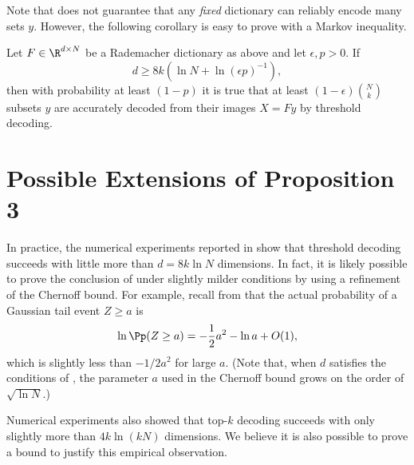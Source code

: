 Note that  does not guarantee that any \textit{fixed} dictionary can reliably encode many sets $y.$ However, the following corollary is easy to prove with a Markov inequality.

\begin{corollary}
	Let $F \in \R^{d \times N}$ be a Rademacher dictionary as above and let $\epsilon, p > 0.$ If
	$$
		d \ge 8 k (\ln N + \ln (\epsilon p)^{-1}),
	$$
	then with probability at least $(1 -p)$ it is true that at least $(1 - \epsilon) \binom N k$ subsets $y$ are accurately decoded from their images $X = F y$ by threshold decoding.
\end{corollary}

\section{Possible Extensions of Proposition 3 \label{appendix:top_k}}

In practice, the numerical experiments reported in  show that threshold decoding succeeds with little more than $d = 8 k \ln N$ dimensions. In fact, it is likely possible to prove the conclusion of  under slightly milder conditions by using a refinement of the Chernoff bound. For example, recall from  that the actual probability of a Gaussian tail event $Z \ge a$ is
$$
	\ln \Pp(Z \ge a) = -\frac 1 2 a^2 - \ln a + O(1),
$$
which is slightly less than $- 1/2 a^2$ for large $a.$ (Note that, when $d$ satisfies the conditions of , the parameter $a$ used in the Chernoff bound grows on the order of $\sqrt{\ln N}.$)

Numerical experiments also showed that top-$k$ decoding succeeds with only slightly more than $4 k \ln (k N)$ dimensions. We believe it is also possible to prove a bound to justify this empirical observation.

